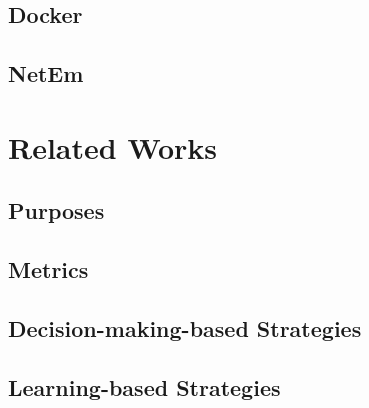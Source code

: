 \subsection{Docker}

\subsection{NetEm} 


\section{Related Works}\label{sec:background:related_works}
\subsection{Purposes}
\subsection{Metrics}
\subsection{Decision-making-based Strategies}
\subsection{Learning-based Strategies}
